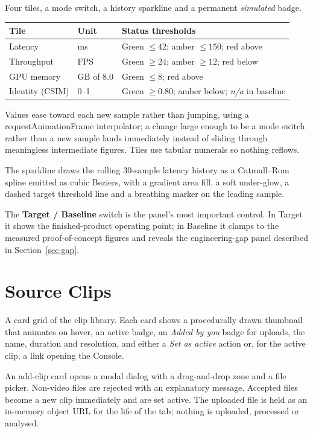 \documentclass[11pt,a4paper]{report}
\begin{document}
Four tiles, a mode switch, a history sparkline and a permanent
\emph{simulated} badge.

\begin{longtable}{L{3.4cm} L{2.6cm} L{8.6cm}}
\toprule
\textbf{Tile} & \textbf{Unit} & \textbf{Status thresholds} \\
\midrule
\endhead
Latency & ms & Green $\leq 42$; amber $\leq 150$; red above \\
Throughput & FPS & Green $\geq 24$; amber $\geq 12$; red below \\
GPU memory & GB of 8.0 & Green $\leq 8$; red above \\
Identity (CSIM) & 0--1 & Green $\geq 0.80$; amber below; \emph{n/a} in baseline \\
\bottomrule
\end{longtable}

Values ease toward each new sample rather than jumping, using a
requestAnimationFrame interpolator; a change large enough to be a mode switch
rather than a new sample lands immediately instead of sliding through
meaningless intermediate figures. Tiles use tabular numerals so nothing
reflows.

The sparkline draws the rolling 30-sample latency history as a Catmull--Rom
spline emitted as cubic Beziers, with a gradient area fill, a soft under-glow,
a dashed target threshold line and a breathing marker on the leading sample.

The \textbf{Target / Baseline} switch is the panel's most important control. In
Target it shows the finished-product operating point; in Baseline it clamps to
the measured proof-of-concept figures and reveals the engineering-gap panel
described in Section~\ref{sec:gap}.

\section{Source Clips}

A card grid of the clip library. Each card shows a procedurally drawn
thumbnail that animates on hover, an active badge, an \emph{Added by you} badge
for uploads, the name, duration and resolution, and either a \emph{Set as
active} action or, for the active clip, a link opening the Console.

An add-clip card opens a modal dialog with a drag-and-drop zone and a file
picker. Non-video files are rejected with an explanatory message. Accepted
files become a new clip immediately and are set active. The uploaded file is
held as an in-memory object URL for the life of the tab; nothing is uploaded,
processed or analysed.
\end{document}
